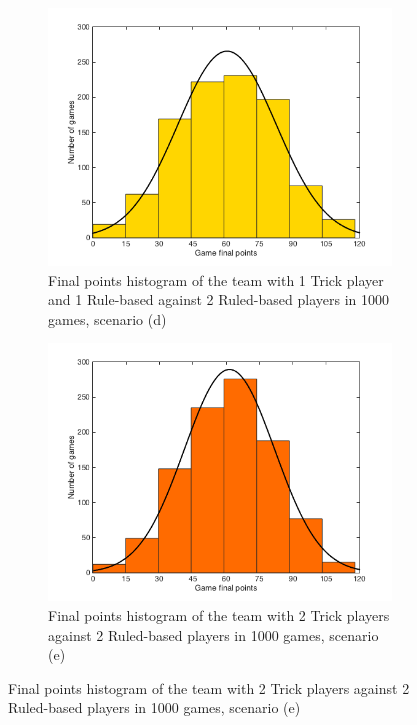 \begin{figure}[h]
  \centering
	\begin{subfigure}[h]{0.49\textwidth}
    	\includegraphics[width=\textwidth]{./img/appendix/histD}
    	\caption{Final points histogram of the team with 1 Trick player and 1 Rule-based against 2 Ruled-based players in 1000 games, scenario (d)}
    \end{subfigure}
    \begin{subfigure}[h]{0.49\textwidth}
    	\includegraphics[width=\textwidth]{./img/appendix/histE}
    	\caption{Final points histogram of the team with 2 Trick players against 2 Ruled-based players in 1000 games, scenario (e)}
    \end{subfigure}
\label{app:histogramDE}
\end{figure}

